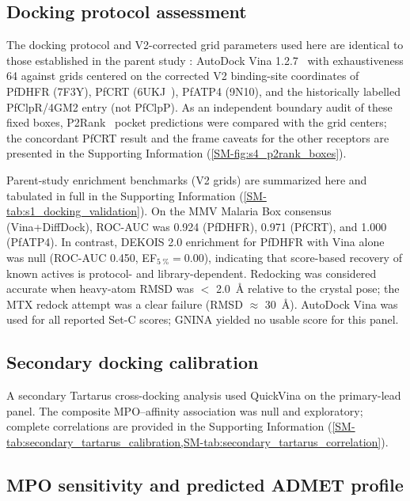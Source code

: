 \documentclass[journal=jcisd8,manuscript=article,layout=traditional]{achemso}
\begin{document}
\subsection{Docking protocol assessment}

The docking protocol and V2-corrected grid parameters used here are identical to those established in the parent study \citep{temgoua2026antimalarial}: AutoDock Vina 1.2.7~\citep{vina_2021} with exhaustiveness \num{64} against grids centered on the corrected V2 binding-site coordinates of PfDHFR (7F3Y), PfCRT (6UKJ~\citep{Kim2019PfCRT}), PfATP4 (9N10), and the historically labelled PfClpR/4GM2 entry (not PfClpP). As an independent boundary audit of these fixed boxes, P2Rank~\citep{Krivak2018P2Rank} pocket predictions were compared with the grid centers; the concordant PfCRT result and the frame caveats for the other receptors are presented in the Supporting Information (\cref{SM-fig:s4_p2rank_boxes}).

Parent-study enrichment benchmarks (V2 grids) are summarized here and tabulated in full in the Supporting Information (\cref{SM-tab:s1_docking_validation}). On the MMV Malaria Box consensus (Vina+DiffDock), ROC-AUC was \num{0.924} (PfDHFR), \num{0.971} (PfCRT), and \num{1.000} (PfATP4). In contrast, DEKOIS 2.0 enrichment for PfDHFR with Vina alone was null (ROC-AUC \num{0.450}, EF$_{\qty{5}{\percent}}=\num{0.00}$), indicating that score-based recovery of known actives is protocol- and library-dependent. Redocking was considered accurate when heavy-atom RMSD was $<$ \qty{2.0}{\angstrom} relative to the crystal pose; the MTX redock attempt was a clear failure (RMSD $\approx$ \qty{30}{\angstrom}). AutoDock Vina was used for all reported Set-C scores; GNINA yielded no usable score for this panel.

\subsection{Secondary docking calibration}

A secondary Tartarus cross-docking analysis used QuickVina on the primary-lead panel. The composite MPO--affinity association was null and exploratory; complete correlations are provided in the Supporting Information (\cref{SM-tab:secondary_tartarus_calibration,SM-tab:secondary_tartarus_correlation}).

\subsection{MPO sensitivity and predicted ADMET profile}
\end{document}
